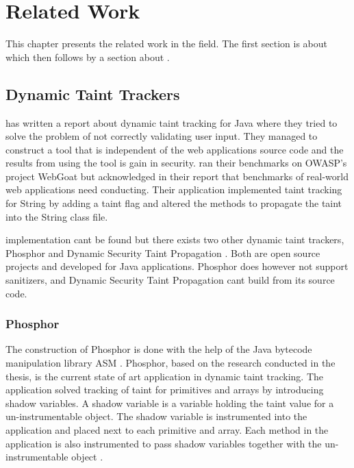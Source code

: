 \chapter{Related Work}
\label{RW}

This chapter presents the related work in the field. The first section is about \textit{} which then follows by a section about \textit{}.



\section{Dynamic Taint Trackers}
\label{RW:DynamicTaintTracking}
\textcite{Haldar} has written a report about dynamic taint tracking for Java where they tried to solve the problem of not correctly validating user input. They managed to construct a tool that is independent of the web applications source code and the results from using the tool is gain in security. \textcite{Haldar} ran their benchmarks on OWASP’s project WebGoat \parencite{webgoat} but acknowledged in their report that benchmarks of real-world web applications need conducting. Their application implemented taint tracking for String by adding a taint flag and altered the methods to propagate the taint into the String class file.

\textcite{Haldar} implementation cant be found but there exists two other dynamic taint trackers, Phosphor \parencite{phosphor} and Dynamic Security Taint Propagation \parencite{securityTaint}. Both are open source projects and developed for Java applications. Phosphor does however not support sanitizers, and Dynamic Security Taint Propagation cant build from its source code.



\subsection{Phosphor}
The construction of Phosphor \parencite{phosphor} is done with the help of the Java bytecode manipulation library ASM \parencite{asm}. Phosphor, based on the research conducted in the thesis, is the current state of art application in dynamic taint tracking. The application solved tracking of taint for primitives and arrays by introducing shadow variables. A shadow variable is a variable holding the taint value for a un-instrumentable object. The shadow variable is instrumented into the application and placed next to each primitive and array. Each method in the application is also instrumented to pass shadow variables together with the un-instrumentable object \parencite{BellJ.2014PIdd}.



